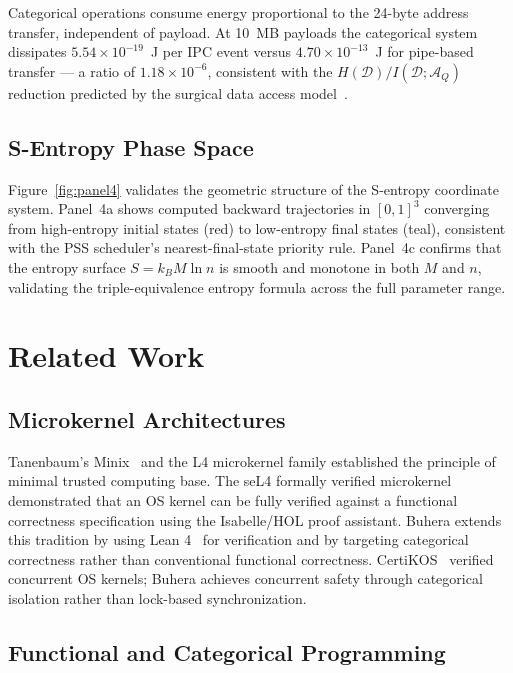 \documentclass[12pt,twocolumn]{article}
\begin{document}
Categorical operations consume energy proportional to the 24-byte address transfer, independent of payload. At 10~MB payloads the categorical system dissipates $5.54 \times 10^{-19}$~J per IPC event versus $4.70 \times 10^{-13}$~J for pipe-based transfer --- a ratio of $1.18 \times 10^{-6}$, consistent with the $H(\mathcal{D}) / I(\mathcal{D}; \mathcal{A}_Q)$ reduction predicted by the surgical data access model~\cite{mudge2000power}.

\subsection{S-Entropy Phase Space}

Figure~\ref{fig:panel4} validates the geometric structure of the S-entropy coordinate system. Panel~4a shows computed backward trajectories in $[0,1]^3$ converging from high-entropy initial states (red) to low-entropy final states (teal), consistent with the PSS scheduler's nearest-final-state priority rule. Panel~4c confirms that the entropy surface $S = k_B M \ln n$ is smooth and monotone in both $M$ and $n$, validating the triple-equivalence entropy formula across the full parameter range.

\section{Related Work}
\label{sec:related}

\subsection{Microkernel Architectures}

Tanenbaum's Minix~\cite{tanenbaum2015modern} and the L4 microkernel family established the principle of minimal trusted computing base. The seL4 formally verified microkernel~\cite{klein2009sel4} demonstrated that an OS kernel can be fully verified against a functional correctness specification using the Isabelle/HOL proof assistant. Buhera extends this tradition by using Lean 4~\cite{moura2021lean4} for verification and by targeting categorical correctness rather than conventional functional correctness. CertiKOS~\cite{hicks2016certikos} verified concurrent OS kernels; Buhera achieves concurrent safety through categorical isolation rather than lock-based synchronization.

\subsection{Functional and Categorical Programming}
\end{document}
